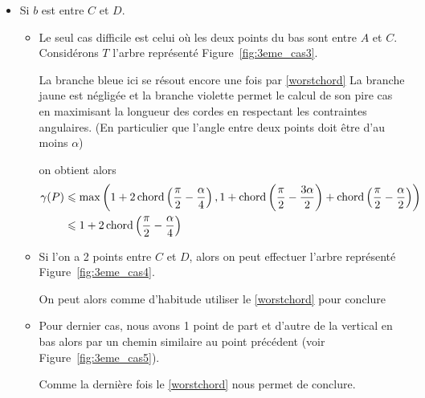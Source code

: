 \begin{itemize}
\begin{itemize}
\end{itemize}

\item \label{3cas2} Si $b$ est entre $C$ et $D$.

\begin{itemize}

\item \label{3cas21} Le seul cas difficile est celui où les deux points du bas sont entre $A$ et $C$.
Considérons $T$ l'arbre représenté Figure~\ref{fig:3eme_cas3}.

La branche bleue ici se résout encore une fois par \ref{worstchord}
La branche jaune est négligée
et la branche violette permet le calcul de son pire cas en maximisant la longueur des cordes en respectant les contraintes angulaires. (En particulier que l'angle entre deux points doit être d'au moins $\alpha$)

on obtient alors
\begin{align*}
\gamma(P) &\leqslant \max\left(1+2\operatorname{chord}\left(\frac{\pi}{2} - \frac{\alpha}{4}\right), 1 + \operatorname{chord}\left(\frac{\pi}{2} - \frac{3\alpha}{2}\right) + \operatorname{chord}\left(\frac{\pi}{2} - \frac{\alpha}{2}\right)\right) \\
&\leqslant 1+2\operatorname{chord}\left(\frac{\pi}{2} - \frac{\alpha}{4}\right)
\end{align*}

\item \label{3cas22} Si l'on a 2 points entre $C$ et $D$, alors on peut
  effectuer l'arbre représenté Figure~\ref{fig:3eme_cas4}.

On peut alors comme d'habitude utiliser le \cref{worstchord} pour conclure

\item \label{3cas23} Pour dernier cas, nous avons 1 point de part et d'autre de
  la vertical en bas alors par un chemin similaire au point précédent (voir
    Figure~\ref{fig:3eme_cas5}).


Comme la dernière fois le \cref{worstchord} nous permet de conclure.

\end{itemize}
\end{itemize}

